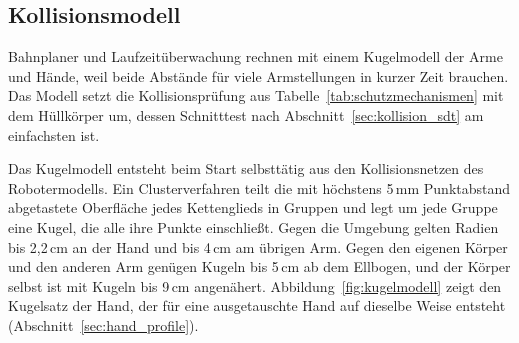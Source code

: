 
\subsection{Kollisionsmodell}
\label{sec:kollisionsmodell}

Bahnplaner und Laufzeitüberwachung rechnen mit einem Kugelmodell der Arme und Hände, weil beide Abstände für viele Armstellungen in kurzer Zeit brauchen.
Das Modell setzt die Kollisionsprüfung aus Tabelle~\ref{tab:schutzmechanismen} mit dem Hüllkörper um, dessen Schnitttest nach Abschnitt~\ref{sec:kollision_sdt} am einfachsten ist.

Das Kugelmodell entsteht beim Start selbsttätig aus den Kollisionsnetzen des Robotermodells.
Ein Clusterverfahren teilt die mit höchstens 5\,mm Punktabstand abgetastete Oberfläche jedes Kettenglieds in Gruppen und legt um jede Gruppe eine Kugel, die alle ihre Punkte einschließt.
Gegen die Umgebung gelten Radien bis 2,2\,cm an der Hand und bis 4\,cm am übrigen Arm.
Gegen den eigenen Körper und den anderen Arm genügen Kugeln bis 5\,cm ab dem Ellbogen, und der Körper selbst ist mit Kugeln bis 9\,cm angenähert.
Abbildung~\ref{fig:kugelmodell} zeigt den Kugelsatz der Hand, der für eine ausgetauschte Hand auf dieselbe Weise entsteht (Abschnitt~\ref{sec:hand_profile}).


